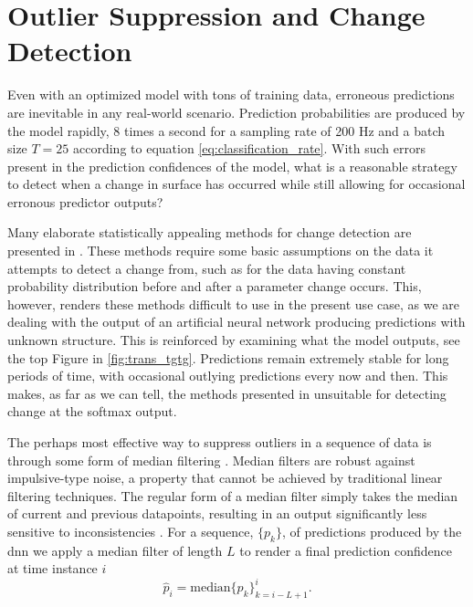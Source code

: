 \section{Outlier Suppression and Change Detection}

\label{surface_change}
Even with an optimized model with tons of training data, erroneous predictions are inevitable in any real-world scenario. Prediction probabilities are produced by the model rapidly, 8 times a second for a sampling rate of 200 Hz and a batch size $T=25$ according to equation \eqref{eq:classification_rate}. With such errors present in the prediction confidences of the model, what is a reasonable strategy to detect when a change in surface has occurred while still allowing for occasional erronous predictor outputs?  

Many elaborate statistically appealing methods for change detection are presented in \citep{basseville_nikiforov_1993}. These methods require some basic assumptions on the data it attempts to detect a change from, such as for the data having constant probability distribution before and after a parameter change occurs. This, however, renders these methods difficult to use in the present use case, as we are dealing with the output of an artificial neural network producing predictions with unknown structure. This is reinforced by examining what the model outputs, see the top Figure in \ref{fig:trans_tgtg}. Predictions remain extremely stable for long periods of time, with occasional outlying predictions every now and then. This makes, as far as we can tell, the methods presented in \citep{basseville_nikiforov_1993} unsuitable for detecting change at the softmax output.

The perhaps most effective way to suppress outliers in a sequence of data is through some form of median filtering \citep{yin_yang_gabbouj_neuvo_1996}. Median filters are robust against impulsive-type noise, a property that cannot be achieved by traditional linear filtering techniques. The regular form of a median filter simply takes the median of current and previous datapoints, resulting in an output significantly less sensitive to inconsistencies \citep{pearson_2002}. For a sequence, $\{p_k\}$, of predictions produced by the \gls{dnn} we apply a median filter of length $L$ to render a final prediction confidence at time instance $i$
\citep{yin_yang_gabbouj_neuvo_1996}
\begin{equation}
	\hat{p}_i=\text{median}\{p_k\}_{k=i-L+1}^i.
\end{equation}

